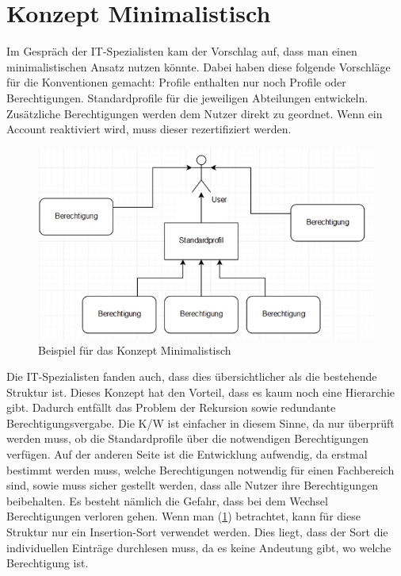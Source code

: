 \section{Konzept Minimalistisch}
\label{sec:chapter04:minimal}
Im Gespräch der IT-Spezialisten kam der Vorschlag auf, dass man einen minimalistischen Ansatz nutzen könnte.
Dabei haben diese folgende Vorschläge für die Konventionen gemacht:
\newline
Profile enthalten nur noch Profile oder Berechtigungen.
Standardprofile für die jeweiligen Abteilungen entwickeln.
Zusätzliche Berechtigungen werden dem Nutzer direkt zu geordnet.
Wenn ein Account reaktiviert wird, muss dieser rezertifiziert werden.
\begin{figure}[h!]
 \centering
 \includegraphics[width=1\textwidth]{gfx/Picture/Minimal.PNG}
 \caption{Beispiel für das Konzept Minimalistisch}
 \label{fig:Min}
\end{figure}
Die IT-Spezialisten fanden auch, dass dies übersichtlicher als die bestehende Struktur ist.
Dieses Konzept hat den Vorteil, dass es kaum noch eine Hierarchie gibt.
Dadurch entfällt das Problem der Rekursion sowie redundante Berechtigungsvergabe.
Die \ac{K/W} ist einfacher in diesem Sinne, da nur überprüft werden muss, ob die Standardprofile über die notwendigen Berechtigungen verfügen.
Auf der anderen Seite ist die Entwicklung aufwendig, da erstmal bestimmt werden muss, welche Berechtigungen notwendig für einen Fachbereich sind, sowie muss sicher gestellt werden, dass alle Nutzer ihre Berechtigungen beibehalten.
Es besteht nämlich die Gefahr, dass bei dem Wechsel Berechtigungen verloren gehen.
\newline
\newline
Wenn man (\ref{fig:Min}) betrachtet, kann für diese Struktur nur ein Insertion-Sort verwendet werden.
Dies liegt, dass der Sort die individuellen Einträge durchlesen muss, da es keine Andeutung gibt, wo welche Berechtigung ist.
